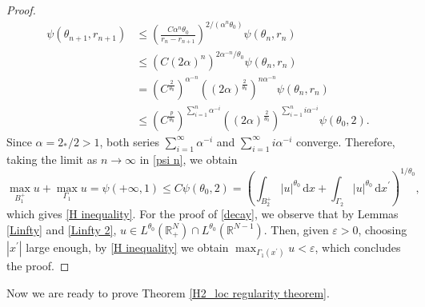 \documentclass[12pt,reqno]{amsart}
\begin{document}
\begin{proof}
\begin{equation}\label{psi n}
			\begin{alignedat}{2}
				\psi(\theta_{n+1},r_{n+1})&\leq \left(\frac{C\alpha^{n}\theta_0}{r_{n}-r_{n+1}}\right)^{2/(\alpha^{n}\theta_0)}\psi(\theta_n,r_{n})\\
				&\leq \left( C(2\alpha)^{n}\right)^{2\alpha^{-n}/\theta_0}\psi(\theta_n,r_{n})\\
				&=\left(C^\frac{2}{\theta_0}\right)^{\alpha^{-n}}\left( (2\alpha)^\frac{2}{\theta_0} \right)^{n\alpha^{-n}}\psi(\theta_n,r_{n})\\
				&\leq \left(C^\frac{p}{\theta_0}\right)^{\sum_{i=1}^n \alpha^{-i}}\left( (2\alpha)^\frac{2}{\theta_0} \right)^{\sum_{i=1}^n i\alpha^{-i}}\psi(\theta_0,2).
			\end{alignedat}
		\end{equation}
Since $\alpha=2_\ast/2>1$, both series $\sum_{i=1}^\infty\alpha^{-i}$ and $\sum_{i=1}^\infty i\alpha^{-i}$ converge. Therefore, taking the limit as $n\longrightarrow \infty$ in \eqref{psi n}, we obtain
\[
		\max_{B_1^+}u+\max_{\Gamma_1}u=\psi(+\infty,1)\leq C\psi(\theta_0,2)=\left( \int_{B_{2}^+}\vert u \vert^{\theta_0}\,\mathrm{d}x+\int_{\Gamma_{2}}\vert u\vert^{\theta_0}\,\mathrm{d}x^\prime \right)^{1/\theta_0},
		\]
which gives \eqref{H inequality}. For the proof of \eqref{decay}, we observe that by Lemmas \ref{Linfty} and \ref{Linfty 2}, $u \in L^{\theta_0}(\mathds{R}^N_+)\cap L^{\theta_0}(\mathds{R}^{N-1})$. Then, given $\varepsilon>0$, choosing $|x^\prime|$ large enough, by \eqref{H inequality} we obtain $\max_{\Gamma_1(x^\prime)}u<\varepsilon$, which concludes the proof.
\end{proof}	

Now we are ready to prove Theorem \ref{H2_loc regularity theorem}.
\end{document}
